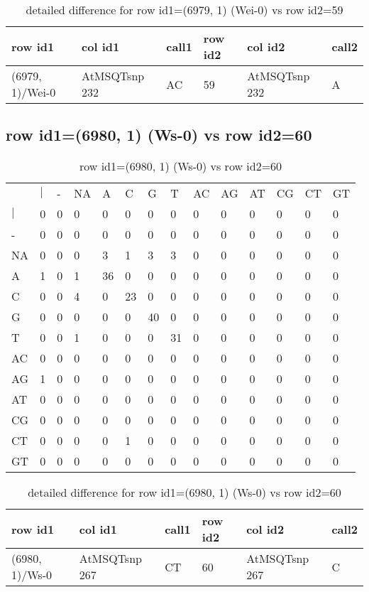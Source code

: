 \begin{center}
\begin{longtable}{|l|l|l|l|l|l|}
\caption{detailed difference for row id1=(6979, 1) (Wei-0) vs row id2=59} \label{table_dm201}\\
\hline
row id1&col id1&call1&row id2&col id2&call2\\
\hline
(6979, 1)/Wei-0&AtMSQTsnp 232&AC&59&AtMSQTsnp 232&A\\
\hline
\end{longtable}
\end{center}

\subsection{row id1=(6980, 1) (Ws-0) vs row id2=60}
\begin{center}
\begin{longtable}{|l|l|l|l|l|l|l|l|l|l|l|l|l|l|}
\caption{row id1=(6980, 1) (Ws-0) vs row id2=60} \label{table_dm202}\\
\hline
\\
\hline
&$|$&-&NA&A&C&G&T&AC&AG&AT&CG&CT&GT\\
$|$&0&0&0&0&0&0&0&0&0&0&0&0&0\\
-&0&0&0&0&0&0&0&0&0&0&0&0&0\\
NA&0&0&0&3&1&3&3&0&0&0&0&0&0\\
A&1&0&1&36&0&0&0&0&0&0&0&0&0\\
C&0&0&4&0&23&0&0&0&0&0&0&0&0\\
G&0&0&0&0&0&40&0&0&0&0&0&0&0\\
T&0&0&1&0&0&0&31&0&0&0&0&0&0\\
AC&0&0&0&0&0&0&0&0&0&0&0&0&0\\
AG&1&0&0&0&0&0&0&0&0&0&0&0&0\\
AT&0&0&0&0&0&0&0&0&0&0&0&0&0\\
CG&0&0&0&0&0&0&0&0&0&0&0&0&0\\
CT&0&0&0&0&1&0&0&0&0&0&0&0&0\\
GT&0&0&0&0&0&0&0&0&0&0&0&0&0\\
\hline
\end{longtable}
\end{center}

\begin{center}
\begin{longtable}{|l|l|l|l|l|l|}
\caption{detailed difference for row id1=(6980, 1) (Ws-0) vs row id2=60} \label{table_dm203}\\
\hline
row id1&col id1&call1&row id2&col id2&call2\\
\hline
(6980, 1)/Ws-0&AtMSQTsnp 267&CT&60&AtMSQTsnp 267&C\\
\hline
\end{longtable}
\end{center}


